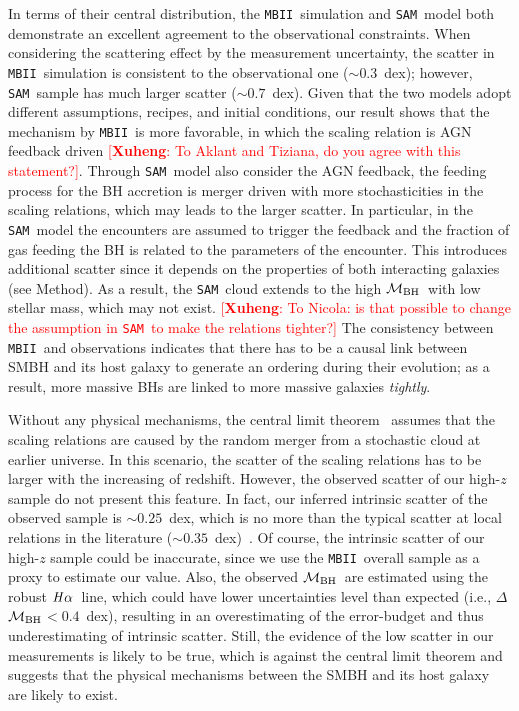 \documentclass{natureprintstyle}
\newcommand{\mbh}{$\mathcal M_{\rm BH}$}
\newcommand{\halpha}{${\it H}\alpha$}
\newcommand{\sam}{\texttt{SAM}}
\newcommand{\mbii}{\texttt{MBII}}
\newcommand{\ding}[1]{\textcolor{red}{[{\bf Xuheng}: #1]}}
\begin{document}
{\color{red} In terms of their central distribution, the \mbii\ simulation and \sam\ model both demonstrate an excellent agreement to the observational constraints. When considering the scattering effect by the measurement uncertainty, the scatter in \mbii\ simulation is consistent to the observational one ($\sim0.3$~dex); however, \sam\ sample has much larger scatter ($\sim0.7$~dex). Given that the two models adopt different assumptions, recipes, and initial conditions, our result shows that the mechanism by \mbii\ is more favorable, in which the scaling relation is AGN feedback driven \ding{To Aklant and Tiziana, do you agree with this statement?}. Through \sam\ model also consider the AGN feedback, the feeding process for the BH accretion is merger driven with more stochasticities in the scaling relations, which may leads to the larger scatter. 
In particular, in the \sam\ model the encounters are assumed to trigger the feedback and the fraction of gas feeding the BH is related to the parameters of the 
encounter. This introduces additional scatter since it depends on the properties of both interacting galaxies (see Method). As a result, the \sam\ cloud extends to the high \mbh\ with low stellar mass, which may not exist. \ding{To Nicola: is that possible to change the assumption in \sam\ to make the relations tighter?} The consistency between \mbii\ and observations indicates that there has to be a causal link between SMBH and its host galaxy to generate an ordering during their evolution; as a result, more massive BHs are linked to more massive galaxies {\it tightly}.
}

Without any physical mechanisms, the central limit theorem~\cite{Peng2007, Jahnke2011, Hirschmann2010} assumes that the scaling relations are caused by the random merger from a stochastic cloud at earlier universe. In this scenario, the scatter of the scaling relations has to be larger with the increasing of redshift. However, the observed scatter of our high-$z$ sample do not present this feature. In fact, our inferred intrinsic scatter of the observed sample is $\sim0.25$~dex, which is no more than the typical scatter at local relations in the literature ($\sim0.35$~dex)~\cite{Kormendy13, Gul++09}. Of course, the intrinsic scatter of our high-$z$ sample could be inaccurate, since we use the \mbii\ overall sample as a proxy to estimate our value.
Also, the observed \mbh\ are estimated using the robust \halpha\ line, which could have lower uncertainties level than expected (i.e., $\Delta$\mbh$<0.4$~dex), resulting in an overestimating of the error-budget and thus underestimating of intrinsic scatter. Still, the evidence of the low scatter in our measurements is likely to be true, which is against the central limit theorem and suggests that the physical mechanisms between the SMBH and its host galaxy are likely to exist. 
\end{document}
